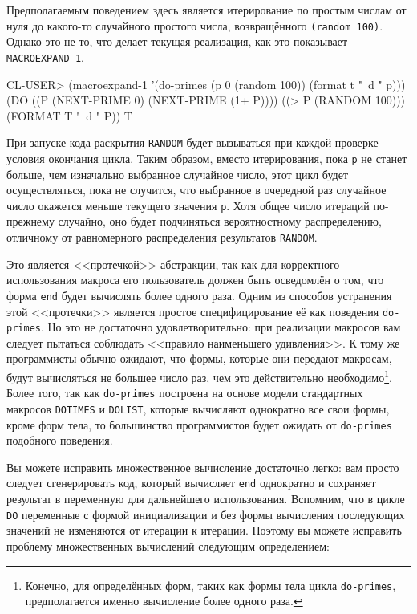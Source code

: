 Предполагаемым поведением здесь является итерирование по простым числам от нуля до
какого-то случайного простого числа, возвращённого \lstinline{(random 100)}. Однако это не то,
что делает текущая реализация, как это показывает \lstinline{MACROEXPAND-1}.

\begin{myverb}
CL-USER> (macroexpand-1 '(do-primes (p 0 (random 100)) (format t "~d " p)))
(DO ((P (NEXT-PRIME 0) (NEXT-PRIME (1+ P))))
    ((> P (RANDOM 100)))
  (FORMAT T "~d " P))
T
\end{myverb}

При запуске кода раскрытия \lstinline{RANDOM} будет вызываться при каждой проверке условия
окончания цикла. Таким образом, вместо итерирования, пока \lstinline{p} не станет больше, чем
изначально выбранное случайное число, этот цикл будет осуществляться, пока не случится, что
выбранное в очередной раз случайное число окажется меньше текущего значения \lstinline{p}. Хотя
общее число итераций по-прежнему случайно, оно будет подчиняться вероятностному
распределению, отличному от равномерного распределения результатов \lstinline{RANDOM}.

Это является <<протечкой>> абстракции, так как для корректного использования макроса его
пользователь должен быть осведомлён о том, что форма \lstinline{end} будет вычислять более
одного раза. Одним из способов устранения этой <<протечки>> является простое
специфицирование её как поведения \lstinline{do-primes}. Но это не достаточно
удовлетворительно: при реализации макросов вам следует пытаться соблюдать <<правило
наименьшего удивления>>. К тому же программисты обычно ожидают, что формы, которые они
передают макросам, будут вычисляться не большее число раз, чем это действительно
необходимо\footnote{Конечно, для определённых форм, таких как формы тела цикла
  \lstinline{do-primes}, предполагается именно вычисление более одного раза.}\hspace{\footnotenegspace}. Более того, так
как \lstinline{do-primes} построена на основе модели стандартных макросов \lstinline{DOTIMES} и
\lstinline{DOLIST}, которые вычисляют однократно все свои формы, кроме форм тела, то
большинство программистов будет ожидать от \lstinline{do-primes} подобного поведения.

Вы можете исправить множественное вычисление достаточно легко: вам просто следует
сгенерировать код, который вычисляет \lstinline{end} однократно и сохраняет результат в
переменную для дальнейшего использования. Вспомним, что в цикле \lstinline{DO} переменные с
формой инициализации и без формы вычисления последующих значений не изменяются от итерации
к итерации. Поэтому вы можете исправить проблему множественных вычислений следующим
определением:

